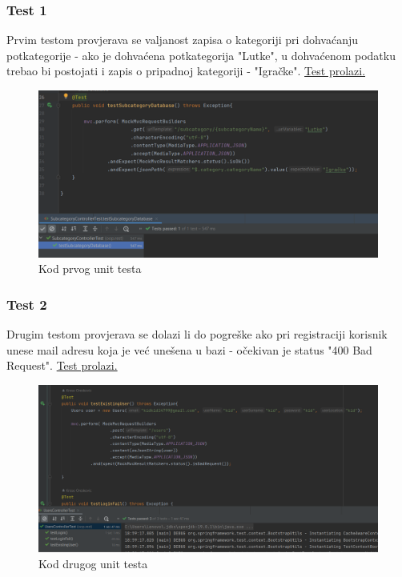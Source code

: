                 \subsubsection{Test 1}
                Prvim testom provjerava se valjanost zapisa o kategoriji pri dohvaćanju potkategorije - ako je dohvaćena potkategorija "Lutke", u dohvaćenom podatku trebao bi postojati i zapis o pripadnoj kategoriji - "Igračke". \underline{Test prolazi.}

                \begin{figure}[H]
				\includegraphics[]{slike/unit1.png}
				\centering
				\caption{Kod prvog unit testa}
				\label{fig:unit1}
			\end{figure}

                \eject

                \subsubsection{Test 2}
                Drugim testom provjerava se dolazi li do pogreške ako pri registraciji korisnik unese mail adresu koja je već unešena u bazi - očekivan je status "400 Bad Request". \underline{Test prolazi.}

                \begin{figure}[H]
				\includegraphics[scale=0.9]{slike/unit2.png}
				\centering
				\caption{Kod drugog unit testa}
				\label{fig:unit2}
			\end{figure}

